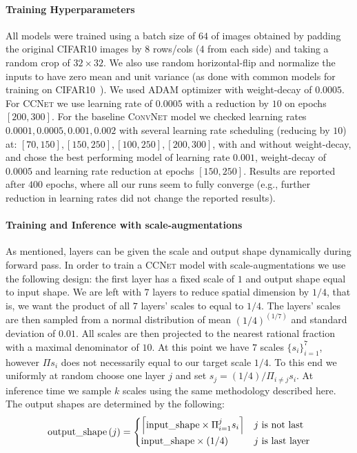 \begin{appendices}
\paragraph{Training Hyperparameters} All models were trained using a batch size of $64$ of images obtained by padding the original CIFAR10 images by 8 rows/cols (4 from each side) and taking a random crop of $32 \times 32$. We also use
random horizontal-flip and normalize the inputs to have zero mean and unit variance (as done with common models for training on \textsc{CIFAR10}~\cite{pytorch-cifar}). 
We used \textsc{ADAM} optimizer \cite{kingma2014adam} with weight-decay of $0.0005$. For \textsc{CCNet} we use learning rate of $0.0005$ with a reduction by $10$ on epochs $[200,300]$. For the baseline \textsc{ConvNet} model we checked learning rates $0.0001, 0.0005, 0.001, 0.002$ with several learning rate scheduling (reducing by $10$) at: $[70,150], [150,250], [100,250], [200,300]$, with and without weight-decay, and chose the best performing model of learning rate $0.001$, weight-decay of $0.0005$ and learning rate reduction at epochs $[150,250]$. Results are reported after $400$ epochs, where all our runs seem to fully converge (e.g., further reduction in learning rates did not change the reported results).

\paragraph{Training and Inference with scale-augmentations} 
As mentioned, \CC layers can be given the scale and output shape dynamically during forward pass. In order to train a \textsc{CCNet} model with scale-augmentations we use the following design: the first \CC layer has a fixed scale of $1$ and output shape equal to input shape. We are left with $7$ \CC layers to reduce spatial dimension by $1/4$, that is, we want the product of all $7$ \CC layers' scales to equal to $1/4$. The \CC layers' scales are then sampled from a normal distribution of mean $(1/4)^{(1/7)}$ and standard deviation of $0.01$. All scales are then projected to the nearest rational fraction with a maximal denominator of $10$. At this point we have $7$ scales $\{s_i \}_{i=1}^7$, however $\Pi s_i$ does not necessarily equal to our target scale $1/4$. To this end we uniformly at random choose one layer $j$ and set $s_j = (1/4) / \Pi_{i \neq j} s_i$. At inference time we sample $k$ scales using the same methodology described here. The output shapes are determined by the following:
\begin{equation}
    \mathrm{output\_shape}\left(j\right) = \begin{cases} 
          \Bigl\lceil{\mathrm{input\_shape} \times \Pi_{i=1}^j s_i }\Bigr\rceil & j\mathrm{\ is\ not\ last} \\
          \mathrm{input\_shape} \times (1/4) & j \mathrm{\ is\ last\ layer} \\
   \end{cases}
   \label{eq:output_shape}
\end{equation}


\end{appendices}
